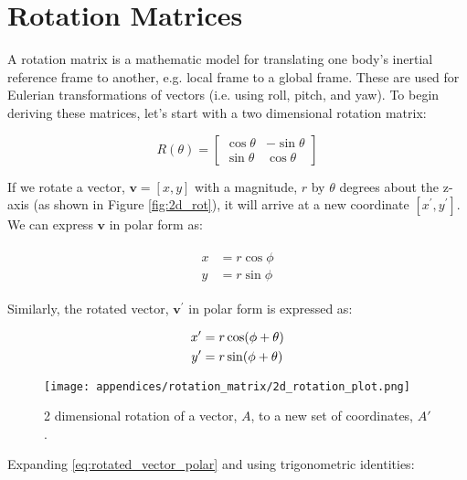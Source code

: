 \chapter{Rotation Matrices} 
A rotation matrix is a mathematic model for translating one body's inertial reference frame to another, e.g. local frame to a global frame.
These are used for Eulerian transformations of vectors (i.e. using roll, pitch, and yaw).
To begin deriving these matrices, let's start with a two dimensional rotation matrix:

\begin{equation}
    R(\theta) = \left[
        \begin{matrix}
            \cos\theta & -\sin\theta \\
            \sin\theta & \cos\theta
        \end{matrix}\right]
\end{equation}

If we rotate a vector, $\pmb{v} = \left[ x, y \right]$ with a magnitude, $r$ by $\theta$ degrees about the z-axis (as shown in Figure \ref{fig:2d_rot}), it will arrive at a new coordinate $\left[ x^{\prime}, y^{\prime} \right]$. 
We can express $\pmb{v}$ in polar form as:

\begin{align}
    \begin{split}
    x &= r\cos\phi \\
    y &= r\sin\phi
    \end{split}
\end{align}

Similarly, the rotated vector, $\pmb{v}^{\prime}$ in polar form is expressed as:

\begin{align} \labeq{rotated_vector_polar}
    \begin{split}
    x^{\prime} &= r\cos(\phi+\theta) \\
    y^{\prime} &= r\sin(\phi+\theta)
    \end{split}
\end{align}

\begin{figure}[h!]
    \caption{2 dimensional rotation of a vector, $A$, to a new set of coordinates, $A'$.}
    \centering
    \texttt{[image: appendices/rotation\_matrix/2d\_rotation\_plot.png]}
\end{figure}

Expanding \ref{eq:rotated_vector_polar} and using trigonometric identities:

